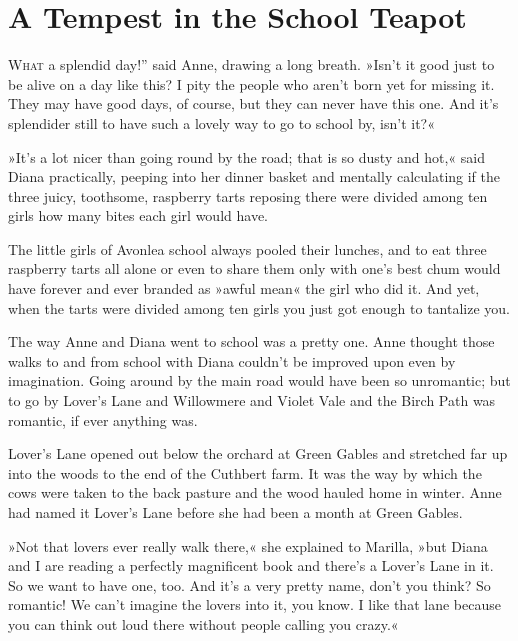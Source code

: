 \chapter{A Tempest in the School Teapot}

\lettrine[ante=“,lines=4]{W}{hat} a splendid day!” said Anne, drawing a long breath. »Isn’t it good just to be alive on a day like this? I pity the people who aren’t born yet for missing it. They may have good days, of course, but they can never have this one. And it’s splendider still to have such a lovely way to go to school by, isn’t it?«

»It’s a lot nicer than going round by the road; that is so dusty and hot,« said Diana practically, peeping into her dinner basket and mentally calculating if the three juicy, toothsome, raspberry tarts reposing there were divided among ten girls how many bites each girl would have.

The little girls of Avonlea school always pooled their lunches, and to eat three raspberry tarts all alone or even to share them only with one’s best chum would have forever and ever branded as »awful mean« the girl who did it. And yet, when the tarts were divided among ten girls you just got enough to tantalize you.

The way Anne and Diana went to school was a pretty one. Anne thought those walks to and from school with Diana couldn’t be improved upon even by imagination. Going around by the main road would have been so unromantic; but to go by Lover’s Lane and Willowmere and Violet Vale and the Birch Path was romantic, if ever anything was.

Lover’s Lane opened out below the orchard at Green Gables and stretched far up into the woods to the end of the Cuthbert farm. It was the way by which the cows were taken to the back pasture and the wood hauled home in winter. Anne had named it Lover’s Lane before she had been a month at Green Gables.

»Not that lovers ever really walk there,« she explained to Marilla, »but Diana and I are reading a perfectly magnificent book and there’s a Lover’s Lane in it. So we want to have one, too. And it’s a very pretty name, don’t you think? So romantic! We can’t imagine the lovers into it, you know. I like that lane because you can think out loud there without people calling you crazy.«

